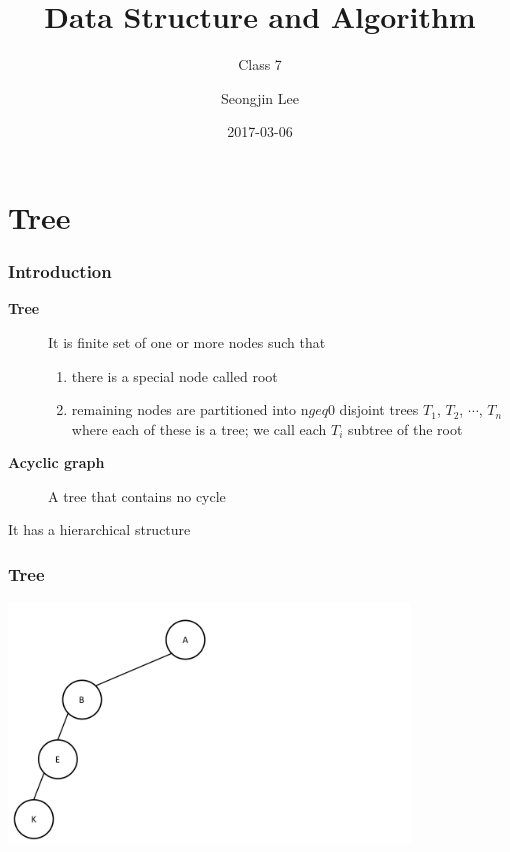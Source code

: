 \documentclass[newPxFont,sthlmFooter,nooffset]{beamer}
\title{Data Structure and Algorithm}
\subtitle{Class 7}
\author[SJL]{Seongjin Lee}
\institute{\href{mailto:insight@gnu.ac.kr}{insight@gnu.ac.kr}\\\url{http://resourceful.github.io}\\Systems Research Lab.\\GNU}
\date{2017-03-06}
\begin{document}
\frame[plain,t]{\titlepage} 




\section{Tree} 
\begin{frame}[t]
  \frametitle{Introduction}
  \begin{description}
  \item[\textbf{Tree}] It is finite set of one or more nodes such that
    \begin{enumerate}
      \item there is a special node called root
      \item remaining nodes are partitioned into n$geq$0 disjoint trees $T_1$, $T_2$, $\cdots$, $T_n$ where each of these is a tree; we call each $T_i$ subtree of the root
    \end{enumerate}
  \item[\textbf{Acyclic graph}] A tree that contains no cycle
  \end{description}

It has a hierarchical structure
\end{frame}

\begin{frame}[t]
  \frametitle{Tree}
  \begin{center}
    \includegraphics[width=0.8\textwidth]{figures/fig01_tree1.png}
  \end{center}

\end{frame}
\end{document}
